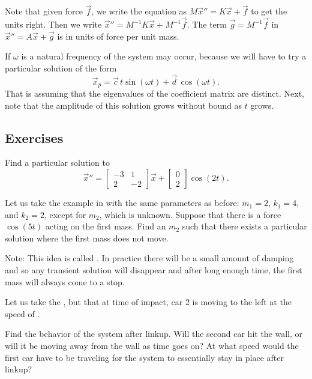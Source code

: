 Note that given force $\vec{f}$, we write 
the equation as $M {\vec{x}}'' = K \vec{x} + \vec{f}$ to get the units
right. Then we write
${\vec{x}}'' = M^{-1}K \vec{x} + M^{-1}\vec{f}$.  The 
term $\vec{g} = M^{-1} \vec{f}$ in ${\vec{x}}'' = A \vec{x} + \vec{g}$ is in units of force
per unit mass.

If $\omega$ is a natural frequency of the system
\emph{} may occur,
because we will have to try a particular solution of the form
\begin{equation*}
\vec{x}_p =
\vec{c} \, t \sin (\omega t) +
\vec{d} \, \cos (\omega t) .
\end{equation*}
That is assuming that the eigenvalues of the coefficient matrix are distinct.
Next, note that the amplitude of this solution grows without bound as $t$ grows.

\subsection{Exercises}

\begin{exercise}
Find a particular solution to
\begin{equation*}
{\vec{x}}'' =
\begin{bmatrix}
-3 & 1 \\
2 & -2
\end{bmatrix}
\vec{x} 
+ 
\begin{bmatrix}
0 \\ 2
\end{bmatrix}
\cos (2 t) .
\end{equation*}
\end{exercise}

\begin{exercise}[challenging]
Let us take the example in  with
the same parameters as before:
$m_1 = 2$, $k_1 = 4$, and $k_2 = 2$, except for $m_2$, which is unknown.
Suppose that there is a force $\cos (5 t)$ acting on the first mass.
Find an $m_2$ such that there exists a particular solution where the
first mass does not move.

Note: This idea is called \emph{}.
In practice there will be a small amount of
damping and so any transient solution will disappear and after long enough
time, the first mass will always come to a stop.
\end{exercise}

\begin{exercise}
Let us take the , but that at
time of impact, car 2 is moving to the left at the speed of
.
\begin{tasks}
\task
Find the behavior of the system after linkup.
\task
Will the second car hit
the wall, or will it be moving away from the wall as time goes on?
\task
At
what speed would the first car have to be traveling for the system to
essentially stay in place after linkup?
\end{tasks}
\end{exercise}


